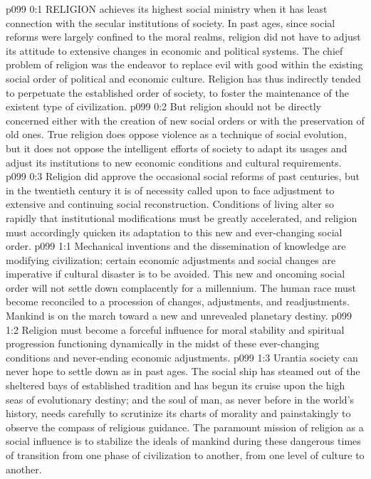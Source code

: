 \vs p099 0:1 RELIGION achieves its highest social ministry when it has least connection with the secular institutions of society. In past ages, since social reforms were largely confined to the moral realms, religion did not have to adjust its attitude to extensive changes in economic and political systems. The chief problem of religion was the endeavor to replace evil with good within the existing social order of political and economic culture. Religion has thus indirectly tended to perpetuate the established order of society, to foster the maintenance of the existent type of civilization.
\vs p099 0:2 But religion should not be directly concerned either with the creation of new social orders or with the preservation of old ones. True religion does oppose violence as a technique of social evolution, but it does not oppose the intelligent efforts of society to adapt its usages and adjust its institutions to new economic conditions and cultural requirements.
\vs p099 0:3 Religion did approve the occasional social reforms of past centuries, but in the twentieth century it is of necessity called upon to face adjustment to extensive and continuing social reconstruction. Conditions of living alter so rapidly that institutional modifications must be greatly accelerated, and religion must accordingly quicken its adaptation to this new and ever\hyp{}changing social order.
\vs p099 1:1 Mechanical inventions and the dissemination of knowledge are modifying civilization; certain economic adjustments and social changes are imperative if cultural disaster is to be avoided. This new and oncoming social order will not settle down complacently for a millennium. The human race must become reconciled to a procession of changes, adjustments, and readjustments. Mankind is on the march toward a new and unrevealed planetary destiny.
\vs p099 1:2 \pc Religion must become a forceful influence for moral stability and spiritual progression functioning dynamically in the midst of these ever\hyp{}changing conditions and never\hyp{}ending economic adjustments.
\vs p099 1:3 \pc Urantia society can never hope to settle down as in past ages. The social ship has steamed out of the sheltered bays of established tradition and has begun its cruise upon the high seas of evolutionary destiny; and the soul of man, as never before in the world’s history, needs carefully to scrutinize its charts of morality and painstakingly to observe the compass of religious guidance. The paramount mission of religion as a social influence is to stabilize the ideals of mankind during these dangerous times of transition from one phase of civilization to another, from one level of culture to another.
